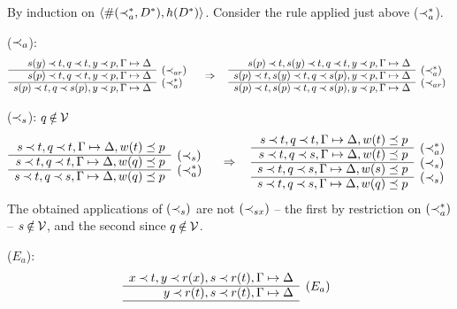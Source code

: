 \begin{PROOF}
By induction on $\langle \#(\mathbin{\prec}_a^*,D^*),h(D^*)\rangle$. Consider the rule
applied just above ($\mathbin{\prec}_a^*$).
\begin{LS}
\item ($\mathbin{\prec}_a$):
\[ \begin{array}{rl}
 s(y) \Incl t, q\Incl t, y\Incl p, \GSD \\ \cline{1-1}
 s(p) \Incl t, q\Incl t, y\Incl p, \GSD & \rabove{(\Incl_{ar})} \\
 \cline{1-1}
 s(p) \Incl t, q\Incl s(p), y\Incl p, \GSD & \rabove{(\Incl_a^*)}
 \end{array} \conv
 \begin{array}{rl}
s(p)\Incl t, s(y)\Incl t, q\Incl t, y\Incl p, \GSD \\ \cline{1-1}
s(p)\Incl t, s(y)\Incl t, q\Incl s(p), y\Incl p, \GSD &
\rabove{(\Incl_a^*)} \\ \cline{1-1}
s(p)\Incl t, s(p)\Incl t, q\Incl s(p), y\Incl p, \GSD &
\rabove{(\Incl_{ar})} \end{array} \]
%
\item ($\mathbin{\prec}_s$): $q\not\in\Vars$
\[ \begin{array}{rl}
s\Incl t, q\Incl t, \GSD, w(t)\preceq p \\ \cline{1-1}
s\Incl t, q\Incl t, \GSD, w(q)\preceq p & \rabove{(\Incl_s)} \\
\cline{1-1}
s\Incl t, q\Incl s, \GSD, w(q)\preceq p & \rabove{(\Incl_a^*)} \end{array} \conv
 \begin{array}{rl}
s\Incl t, q\Incl t, \GSD, w(t)\preceq p \\ \cline{1-1}
s\Incl t, q\Incl s, \GSD, w(t)\preceq p & \rabove{(\Incl_a^*)} \\
\cline{1-1}
s\Incl t, q\Incl s, \GSD, w(s)\preceq p & \rabove{(\Incl_s)} \\
\cline{1-1} 
s\Incl t, q\Incl s, \GSD, w(q)\preceq p & \rabove{(\Incl_s)} 
\end{array} \]
The obtained applications of $(\mathbin{\prec}_s)$ are not $(\mathbin{\prec}_{sx})$ -- the first
by restriction on $(\mathbin{\prec}_a^*)$ -- $s\not\in\Vars$, and the second since $q\not\in\Vars$.
\item ($E_a$):
\[ \begin{array}{rl}
x\Incl t, y\Incl r(x), s\Incl r(t), \GSD \\ \cline{1-1}
          y\Incl r(t), s\Incl r(t), \GSD  & \rabove{(E_a)} \\ \cline{1-1}

\end{array}\]
\end{LS}
\end{PROOF}
